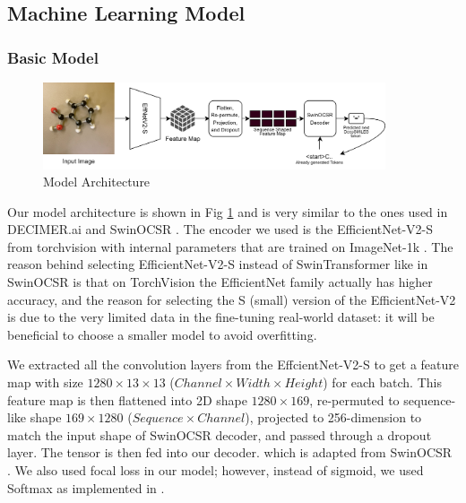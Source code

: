 \documentclass[12pt]{article}
\begin{document}
\subsection{Machine Learning Model} 
\subsubsection{Basic Model}
\begin{figure}
    \centering
    \includegraphics[width=0.9\textwidth]{arch}
    \caption{Model Architecture}
    \label{fig:arch}
\end{figure}

Our model architecture is shown in Fig \ref{fig:arch} and is very similar to the ones used in DECIMER.ai \autocite{decimer} and SwinOCSR \autocite{swinocsr}. The encoder we used is the EfficientNet-V2-S \autocite{effv2} from torchvision \autocite{torchvision2016} with internal parameters that are trained on ImageNet-1k \autocite{imagenet}. The reason behind selecting EfficientNet-V2-S instead of SwinTransformer like in SwinOCSR \autocite{swinocsr} is that on TorchVision the EfficientNet family actually has higher accuracy, and the reason for selecting the S (small) version of the EfficientNet-V2 is due to the very limited data in the fine-tuning real-world dataset: it will be beneficial to choose a smaller model to avoid overfitting. 

We extracted all the convolution layers from the EffcientNet-V2-S to get a feature map with size $1280\times13\times13$ ($Channel \times Width \times Height$)  for each batch. This feature map is then flattened into 2D shape $1280\times169$, re-permuted to sequence-like shape $169\times1280$ ($Sequence \times Channel$), projected to 256-dimension to match the input shape of SwinOCSR decoder, and passed through a dropout layer. The tensor is then fed into our decoder. which is adapted from SwinOCSR \autocite{swinocsr}. We also used focal loss in our model; however, instead of sigmoid, we used Softmax as implemented in \cite{torch_focal}.
\end{document}
